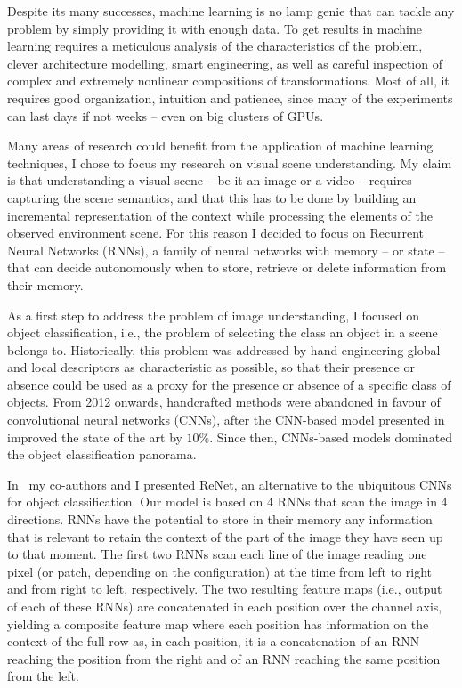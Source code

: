 Despite its many successes, machine learning is no lamp genie that can tackle
any problem by simply providing it with enough data. To get results in machine
learning requires a meticulous analysis of the characteristics of the problem,
clever architecture modelling, smart engineering, as well as careful inspection
of complex and extremely nonlinear compositions of transformations. Most of
all, it requires good organization, intuition and patience, since many of the
experiments can last days if not weeks -- even on big clusters of GPUs.

Many areas of research could benefit from the application of machine learning
techniques, I chose to focus my research on visual scene understanding. My
claim is that understanding a visual scene -- be it an image or a video --
requires capturing the scene semantics, and that this has to be done by
building an incremental representation of the context while processing the
elements of the observed environment scene. For this reason I decided to focus
on Recurrent Neural Networks (RNNs), a family of neural networks with memory --
or state -- that can decide autonomously when to store, retrieve or delete
information from their memory.

As a first step to address the problem of image understanding, I focused on
object classification, i.e., the problem of selecting the class an object in a
scene belongs to. Historically, this problem was addressed by hand-engineering
global and local descriptors as characteristic as possible, so that their
presence or absence could be used as a proxy for the presence or absence of a
specific class of objects. From 2012 onwards, handcrafted methods were
abandoned in favour of convolutional neural networks (CNNs), after the
CNN-based model presented in~\cite{Krizhevsky-2012} improved the state of the
art by $10\%$. Since then, CNNs-based models dominated the object
classification panorama.

In~\cite{visin2015renet} my co-authors and I presented ReNet, an alternative to
the ubiquitous CNNs for object classification. Our model is based on 4 RNNs
that scan the image in 4 directions. RNNs have the potential to store in their
memory any information that is relevant to retain the context of the part of
the image they have seen up to that moment. The first two RNNs scan each line
of the image reading one pixel (or patch, depending on the configuration) at
the time from left to right and from right to left, respectively. The two
resulting feature maps (i.e., output of each of these RNNs) are concatenated in
each position over the channel axis, yielding a composite feature map where
each position has information on the context of the full row as, in each
position, it is a concatenation of an RNN reaching the position from the right
and of an RNN reaching the same position from the left.

